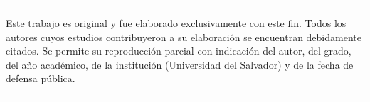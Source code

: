 
\mbox{}
\vfill

{\small\onehalfspacing
\begin{center}

\noindent\rule{\textwidth}{1pt} %

    Este trabajo es original y fue elaborado exclusivamente con este fin.
    Todos los autores cuyos estudios contribuyeron a su elaboración se
    encuentran debidamente citados. Se permite su reproducción parcial con
    indicación del autor, del grado, del año académico, de la institución
    (Universidad del Salvador) y de la fecha de defensa pública.

\noindent\rule{\textwidth}{.2pt} %

\end{center}
} %
